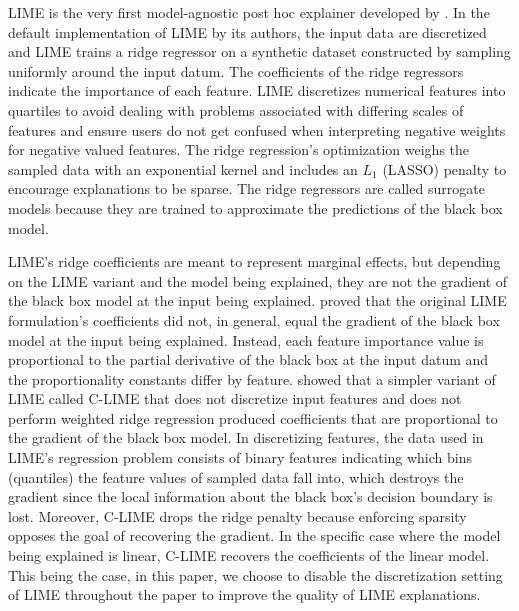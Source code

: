 \documentclass[12pt]{article}  %
\begin{document}
    
LIME is the very first model-agnostic post hoc explainer developed by \citet{ribeiro16lime}. In the default implementation of LIME by its authors, the input data are discretized and LIME trains a ridge regressor on a synthetic dataset constructed by sampling uniformly around the input datum. The coefficients of the ridge regressors indicate the importance of each feature. LIME discretizes numerical features into quartiles to avoid dealing with problems associated with differing scales of features and ensure users do not get confused when interpreting negative weights for negative valued features. The ridge regression's optimization weighs the sampled data with an exponential kernel and includes an $L_1$ (LASSO) penalty to encourage explanations to be sparse. The ridge regressors are called surrogate models because they are trained to approximate the predictions of the black box model.
    
    LIME's ridge coefficients are meant to represent marginal effects, but depending on the LIME variant and the model being explained, they are not the gradient of the black box model at the input being explained. \citet{garreau2020looking} proved that the original LIME formulation's coefficients did not, in general, equal the gradient of the black box model at the input being explained. Instead, each feature importance value is proportional to the partial derivative of the black box at the input datum and the proportionality constants differ by feature. \citet{agarwal21clime} showed that a simpler variant of LIME called C-LIME that does not discretize input features and does not perform weighted ridge regression produced coefficients that are proportional to the gradient of the black box model. %
    In discretizing features, the data used in LIME's regression problem consists of binary features indicating which bins (quantiles) the feature values of sampled data fall into, which destroys the gradient since the local information about the black box's decision boundary is lost. Moreover, C-LIME drops the ridge penalty because enforcing sparsity opposes the goal of recovering the gradient. In the specific case where the model being explained is linear, C-LIME recovers the coefficients of the linear model. This being the case, in this paper, we choose to disable the discretization setting of LIME throughout the paper to improve the quality of LIME explanations.
\end{document}
